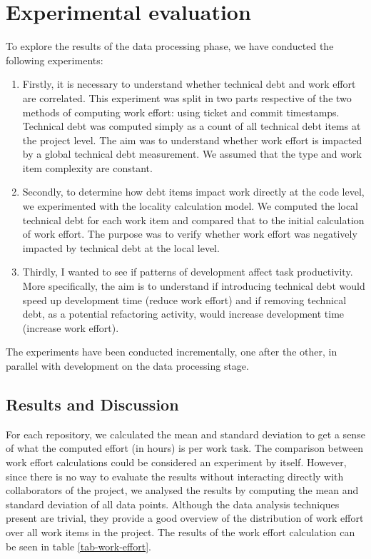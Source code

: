 \documentclass{mpaper}
\begin{document}
\section{Experimental evaluation}
\label{evaluation}

To explore the results of the data processing phase, we have conducted the
following experiments:

\begin{enumerate}
  
  \item Firstly, it is necessary to understand whether technical debt and work
  effort are correlated. This experiment was split in two parts respective of
  the two methods of computing work effort: using ticket and commit timestamps.
  Technical debt was computed simply as a count of all technical debt items at
  the project level. The aim was to understand whether work effort is impacted
  by a global technical debt measurement. We assumed that the type and work item
  complexity are constant.

  \item Secondly, to determine how debt items impact work directly at the code
  level, we experimented with the locality calculation model. We computed the
  local technical debt for each work item and compared that to the initial
  calculation of work effort. The purpose was to verify whether work effort was
  negatively impacted by technical debt at the local level. 
  
  \item Thirdly, I wanted to see if patterns of development affect task
  productivity. More specifically, the aim is to understand if introducing
  technical debt would speed up development time (reduce work effort) and if
  removing technical debt, as a potential refactoring activity, would increase
  development time (increase work effort).
\end{enumerate}

The experiments have been conducted incrementally, one after the other, in
parallel with development on the data processing stage.  

\subsection{Results and Discussion}
\label{results-discussion}

For each repository, we calculated the mean and standard deviation to get a
sense of what the computed effort (in hours) is per work task. The comparison
between work effort calculations could be considered an experiment by itself.
However, since there is no way to evaluate the results without interacting
directly with collaborators of the project, we analysed the results by computing
the mean and standard deviation of all data points. Although the data analysis
techniques present are trivial, they provide a good overview of the distribution
of work effort over all work items in the project. The results of the work
effort calculation can be seen in table \ref{tab-work-effort}.  
\end{document}
